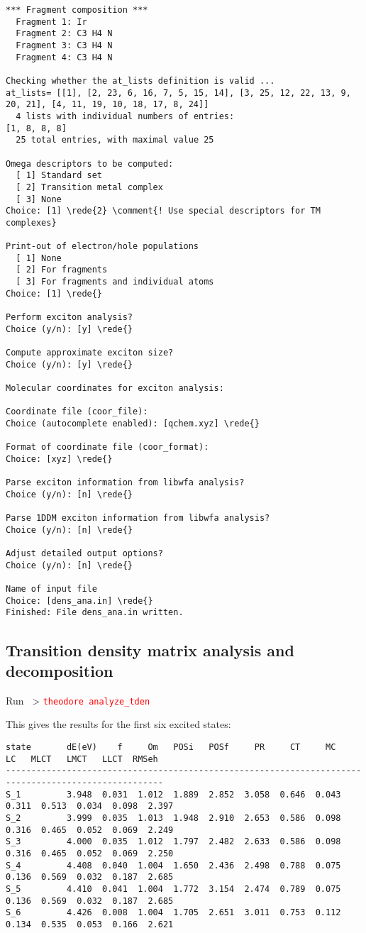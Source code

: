 \documentclass[DIV=12,headings=normal]{scrartcl}
\newcommand{\comment}[1]{\textcolor{blue}{#1}}
\newcommand{\redl}[1]{{\textcolor{red}{\texttt{#1}}}}
\newcommand{\rede}[1]{\redl{#1 <ENTER>}}
\newcommand{\comm}[1]{
\small
~> \redl{#1}
\normalsize
}
\newcounter{number}
\begin{document}
\begin{Verbatim}[commandchars=\\\{\}]
*** Fragment composition ***
  Fragment 1: Ir 
  Fragment 2: C3 H4 N 
  Fragment 3: C3 H4 N 
  Fragment 4: C3 H4 N 

Checking whether the at_lists definition is valid ...
at_lists= [[1], [2, 23, 6, 16, 7, 5, 15, 14], [3, 25, 12, 22, 13, 9, 20, 21], [4, 11, 19, 10, 18, 17, 8, 24]]
  4 lists with individual numbers of entries:
[1, 8, 8, 8]
  25 total entries, with maximal value 25

Omega descriptors to be computed:
  [ 1] Standard set
  [ 2] Transition metal complex
  [ 3] None
Choice: [1] \rede{2} \comment{! Use special descriptors for TM complexes} 

Print-out of electron/hole populations
  [ 1] None
  [ 2] For fragments
  [ 3] For fragments and individual atoms
Choice: [1] \rede{}

Perform exciton analysis?
Choice (y/n): [y] \rede{}

Compute approximate exciton size?
Choice (y/n): [y] \rede{}

Molecular coordinates for exciton analysis:

Coordinate file (coor_file):
Choice (autocomplete enabled): [qchem.xyz] \rede{}

Format of coordinate file (coor_format):
Choice: [xyz] \rede{}

Parse exciton information from libwfa analysis?
Choice (y/n): [n] \rede{}

Parse 1DDM exciton information from libwfa analysis?
Choice (y/n): [n] \rede{}

Adjust detailed output options?
Choice (y/n): [n] \rede{}

Name of input file
Choice: [dens_ana.in] \rede{}
Finished: File dens_ana.in written.

\end{Verbatim}
\normalsize

\clearpage
\subsection{Transition density matrix analysis and decomposition}
Run \comm{theodore analyze\_tden}

This gives the results for the first six excited states:
\scriptsize
\begin{Verbatim}[commandchars=\\\{\}]
state       dE(eV)    f     Om   POSi   POSf     PR     CT     MC     LC   MLCT   LMCT   LLCT  RMSeh
-----------------------------------------------------------------------------------------------------
S_1         3.948  0.031  1.012  1.889  2.852  3.058  0.646  0.043  0.311  0.513  0.034  0.098  2.397
S_2         3.999  0.035  1.013  1.948  2.910  2.653  0.586  0.098  0.316  0.465  0.052  0.069  2.249
S_3         4.000  0.035  1.012  1.797  2.482  2.633  0.586  0.098  0.316  0.465  0.052  0.069  2.250
S_4         4.408  0.040  1.004  1.650  2.436  2.498  0.788  0.075  0.136  0.569  0.032  0.187  2.685
S_5         4.410  0.041  1.004  1.772  3.154  2.474  0.789  0.075  0.136  0.569  0.032  0.187  2.685
S_6         4.426  0.008  1.004  1.705  2.651  3.011  0.753  0.112  0.134  0.535  0.053  0.166  2.621
\end{Verbatim}
\normalsize
\end{document}
